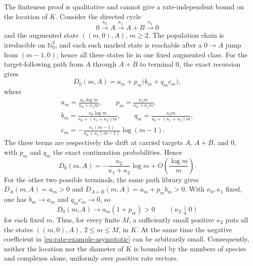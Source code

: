 \begin{remark}\label{rem:rate-dependence}
The finiteness proof is qualitative and cannot give a rate-independent bound
on the location of \(K\).  Consider the directed cycle
\[
 0\xrightarrow{\kappa_0}A
 \xrightarrow{\kappa_1}A+B
 \xrightarrow{\kappa_2}0
\]
and the augmented state \(((m,0),A)\), \(m\ge2\).  The population chain is
irreducible on \(\mathbb N_0^2\), and each such marked state is reachable
after a \(0\to A\) jump from \((m-1,0)\); hence all these states lie in one
fixed augmented class.  For the target-following path from \(A\) through
\(A+B\) to terminal \(0\), the exact recursion gives
\begin{equation}\label{eq:rate-example}
 D_0(m,A)=a_m+p_m\bigl(b_m+q_mc_m\bigr),
\end{equation}
where
\[
\begin{gathered}
 a_m=\frac{\kappa_0\log m}{\kappa_0+\kappa_1m},\qquad
 p_m=\frac{\kappa_1m}{\kappa_0+\kappa_1m},\\
 b_m=\frac{\kappa_0\log m}{\kappa_0+(\kappa_1+\kappa_2)m},\qquad
 q_m=\frac{\kappa_2m}{\kappa_0+(\kappa_1+\kappa_2)m},\\
 c_m=-\frac{\kappa_1(m-1)}{\kappa_0+\kappa_1(m-1)}\log(m-1).
\end{gathered}
\]
The three terms are respectively the drift at carried targets \(A\),
\(A+B\), and \(0\), with \(p_m\) and \(q_m\) the exact continuation
probabilities.  Hence
\begin{equation}\label{eq:rate-example-asymptotic}
 D_0(m,A)=-\frac{\kappa_2}{\kappa_1+\kappa_2}\log m
 +O\!\left(\frac{\log m}{m}\right).
\end{equation}
For the other two possible terminals, the same path library gives
\(D_A(m,A)=a_m>0\) and
\(D_{A+B}(m,A)=a_m+p_mb_m>0\).  With \(\kappa_0,\kappa_1\) fixed,
one has \(b_m\to a_m\) and \(q_mc_m\to0\), so
\begin{equation}\label{eq:rate-example-limit}
  D_0(m,A)\longrightarrow a_m(1+p_m)>0
  \qquad(\kappa_2\downarrow0)
\end{equation}
for each fixed \(m\).  Thus, for every finite
\(M\), a sufficiently small positive \(\kappa_2\) puts all the states
\(((m,0),A)\), \(2\le m\le M\), in \(K\).  At the same time the negative
coefficient in \eqref{eq:rate-example-asymptotic} can be arbitrarily small.
Consequently, neither the location nor the diameter of \(K\) is bounded by the
numbers of species and complexes alone, uniformly over positive rate vectors.


\end{remark}
